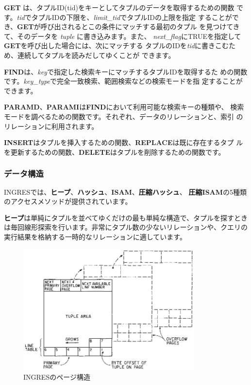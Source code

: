 {\bf GET} は、タプルID(tid)をキーとしてタプルのデータを取得するための関数
です。{\it tid}でタプルIDの下限を、{\it limit\_tid}でタプルIDの上限を指定
することができ、{\bf GET}が呼び出されるとこの条件にマッチする最初のタプル
を見つけてきて、そのデータを {\it tuple} に書き込みます。また、{\it
next\_flag}にTRUEを指定して{\bf GET}を呼び出した場合には、次にマッチする
タプルのIDを{\it tid}に書きこむため、連続してタプルを読みだしてゆくことが
できます。


{\bf FIND}は、{\it key}で指定した検索キーにマッチするタプルIDを取得するた
めの関数です。{\it key\_type}で完全一致検索、範囲検索などの検索モードを指
定することができます。


{\bf PARAMD}、{\bf PARAMI}は{\bf FIND}において利用可能な検索キーの種類や、
検索モードを調べるための関数です。それぞれ、データのリレーションと、索引
のリレーションに利用されます。


{\bf INSERT}はタプルを挿入するための関数、{\bf REPLACE}は既に存在するタプ
ルを更新するための関数、{\bf DELETE}はタプルを削除するための関数です。


\subsubsection{データ構造}


INGRESでは、{\bf ヒープ}、{\bf ハッシュ}、{\bf ISAM}、{\bf 圧縮ハッシュ}、
{\bf 圧縮ISAM}の5種類のアクセスメソッドが提供されています。


{\bf ヒープ}は単純にタプルを並べてゆくだけの最も単純な構造で、タプルを探すとき
は毎回線形探索を行います。非常にタプル数の少ないリレーションや、クエリの
実行結果を格納する一時的なリレーションに適しています。


\begin{figure}[tb]
 \begin{center}
  \includegraphics[height=66mm]{hayamiz/images/page-layout-ingres.eps}
  \caption{INGRESのページ構造}
  \label{174456_16Jul12}
 \end{center}
\end{figure}


